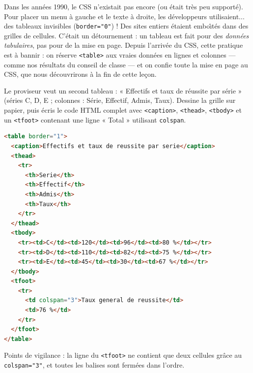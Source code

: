 \documentclass[11pt]{article}
\begin{document}
\begin{savaistu}
Dans les ann\'ees 1990, le CSS n'existait pas encore (ou \'etait tr\`es peu support\'e). Pour placer un menu \`a gauche et le texte \`a droite, les d\'eveloppeurs utilisaient... des tableaux invisibles (\texttt{border="0"}) ! Des sites entiers \'etaient embo\^\i{}t\'es dans des grilles de cellules. C'\'etait un d\'etournement : un tableau est fait pour des \emph{donn\'ees tabulaires}, pas pour de la mise en page. Depuis l'arriv\'ee du CSS, cette pratique est \`a bannir : on r\'eserve \texttt{<table>} aux vraies donn\'ees en lignes et colonnes — comme nos r\'esultats du conseil de classe — et on confie toute la mise en page au CSS, que nous d\'ecouvrirons \`a la fin de cette le\c{c}on.
\end{savaistu}

\begin{exercice}
Le proviseur veut un second tableau : « Effectifs et taux de r\'eussite par s\'erie » (s\'eries C, D, E ; colonnes : S\'erie, Effectif, Admis, Taux). Dessine la grille sur papier, puis \'ecris le code HTML complet avec \texttt{<caption>}, \texttt{<thead>}, \texttt{<tbody>} et un \texttt{<tfoot>} contenant une ligne « Total » utilisant \texttt{colspan}.
\end{exercice}

\begin{corrige}[Exercice 1]
\begin{lstlisting}[language=HTML]
<table border="1">
  <caption>Effectifs et taux de reussite par serie</caption>
  <thead>
    <tr>
      <th>Serie</th>
      <th>Effectif</th>
      <th>Admis</th>
      <th>Taux</th>
    </tr>
  </thead>
  <tbody>
    <tr><td>C</td><td>120</td><td>96</td><td>80 %</td></tr>
    <tr><td>D</td><td>110</td><td>82</td><td>75 %</td></tr>
    <tr><td>E</td><td>45</td><td>30</td><td>67 %</td></tr>
  </tbody>
  <tfoot>
    <tr>
      <td colspan="3">Taux general de reussite</td>
      <td>76 %</td>
    </tr>
  </tfoot>
</table>
\end{lstlisting}
Points de vigilance : la ligne du \texttt{<tfoot>} ne contient que deux cellules gr\^ace au \texttt{colspan="3"}, et toutes les balises sont ferm\'ees dans l'ordre.
\end{corrige}
\end{document}
